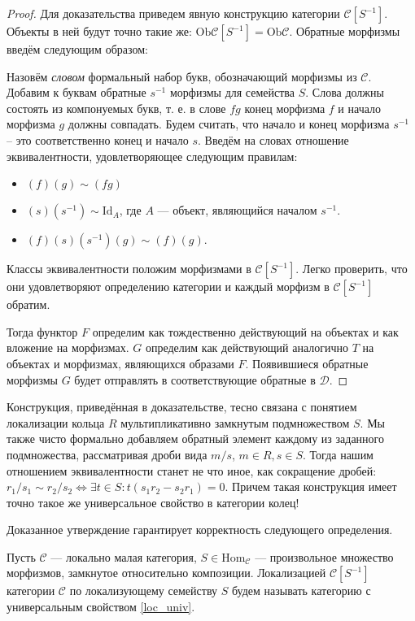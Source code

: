 \documentclass[../main.tex]{subfiles}
\begin{document}
\begin{proof}
  Для доказательства приведем явную конструкцию категории $\mathcal{C}[S^{-1}]$. 
  Объекты в ней будут точно такие же: $\text{Ob}\mathcal{C}[S^{-1}] = \text{Ob}\mathcal{C}$. 
  Обратные морфизмы введём следующим образом:

  Назовём \emph{словом} формальный набор букв, обозначающий морфизмы из $\mathcal{C}$. 
  Добавим к буквам обратные $s^{-1}$ морфизмы для семейства $S$. 
  Слова должны состоять из компонуемых букв, т. е. в слове $fg$ конец морфизма $f$ и начало морфизма $g$ должны совпадать. 
  Будем считать, что начало и конец морфизма $s^{-1}$ -- это соответственно конец и начало $s$. 
  Введём на словах отношение эквивалентности, удовлетворяющее следующим правилам:
  \begin{itemize}
    \item $(f)(g) \sim (fg)$
    \item $(s)(s^{-1}) \sim \text{Id}_{A}$, где $A$ --- объект, являющийся началом $s^{-1}$.
    \item $(f)(s)(s^{-1})(g) \sim (f)(g)$.
  \end{itemize}
  Классы эквивалентности положим морфизмами в $\mathcal{C}[S^{-1}]$. 
  Легко проверить, что они удовлетворяют определению категории и каждый морфизм в $\mathcal{C}[S^{-1}]$ обратим.

  Тогда функтор $F$ определим как тождественно действующий на объектах и как вложение на морфизмах. 
  $G$ определим как действующий аналогично $T$ на объектах и морфизмах, являющихся образами $F$. 
  Появившиеся обратные морфизмы $G$ будет отправлять в соответствующие обратные в $\mathcal{D}$.
\end{proof}

\begin{to_com}
  Конструкция, приведённая в доказательстве, тесно связана с понятием локализации кольца $R$ мультипликативно замкнутым подмножеством $S$. 
  Мы также чисто формально добавляем обратный элемент каждому из заданного подмножества, рассматривая дроби вида $m/s$, $m\in R, s\in S$. 
  Тогда нашим отношением эквивалентности станет не что иное, как сокращение дробей: $r_1/s_1\sim r_2/s_2 \iff \exists t\in S:t(s_1r_2 - s_2r_1)=0$. 
  Причем такая конструкция имеет точно такое же универсальное свойство в категории колец!
\end{to_com}

Доказанное утверждение гарантирует корректность следующего определения.
\begin{to_def}
  Пусть $\mathcal{C}$ --- локально малая категория, $S\in \text{Hom}_\mathcal{C}$ --- произвольное множество морфизмов, замкнутое относительно композиции. 
  Локализацией $\mathcal{C}[S^{-1}]$ категории $\mathcal{C}$ по локализующему семейству $S$ будем называть категорию с универсальным свойством \eqref{loc_univ}.
\end{to_def}
\end{document}
